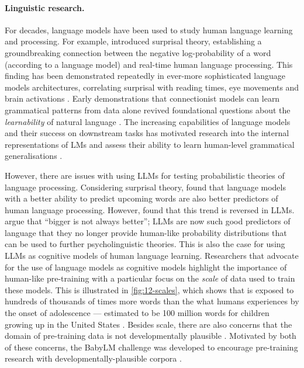 \paragraph{Linguistic research.} For decades, language models have been used to study human language learning and processing. For example, \citet{hale-2001-probabilistic} introduced surprisal theory, establishing a groundbreaking connection between the negative log-probability of a word (according to a language model) and real-time human language processing. This finding has been demonstrated repeatedly in ever-more sophisticated language models architectures, correlating surprisal with reading times, eye movements and brain activations \citep[e.g.][]{levy2008expectation, futrell2019neural, futrell2020lossy, schrimpf2021neural}. Early demonstrations that connectionist models can learn grammatical patterns from data alone \citep[e.g.,][]{elman-1990-finding, macdonald1994lexical} revived foundational questions about the \emph{learnability} of natural language \citep{gold1967language}. The increasing capabilities of language models and their success on downstream tasks has motivated research into the internal representations of LMs and assess their ability to learn human-level grammatical generalisations \citep{hewitt-manning-2019-structural, hu-etal-2020-systematic, manning-2020-emergent}.


However, there are issues with using LLMs for testing probabilistic theories of language processing. Considering surprisal theory, \citet{wilcox2020predictive} found that language models with a better ability to predict upcoming words are also better predictors of human language processing. However, \citet{shain2024large, oh2024frequency} found that this trend is reversed in LLMs. \citet{wilcox2025} argue that ``bigger is not always better''; LLMs are now such good predictors of language that they no longer provide human-like probability distributions that can be used to further psycholinguistic theories. This is also the case for using LLMs as cognitive models of human language learning. Researchers that advocate for the use of language models as cognitive models highlight the importance of human-like pre-training \citep{linzen-2020-accelerate, baroni-2022-proper,warstadt-2022-artificial,wilcox2025} with a particular focus on the \emph{scale} of data used to train these models. This is illustrated in \cref{fig:12-scales}, which shows that  is exposed to hundreds of thousands of times more words than the what humans experiences by the onset of adolescence --- estimated to be 100 million words for children growing up in the United States \citep{gilkerson2017mapping}. Besides scale, there are also concerns that the domain of pre-training data is not developmentally plausible \citep{huebner-etal-2021-babyberta, warstadt2023findings}. Motivated by both of these concerns, the BabyLM challenge was developed to encourage pre-training research with developmentally-plausible corpora \citep{warstadt2023findings}. 

